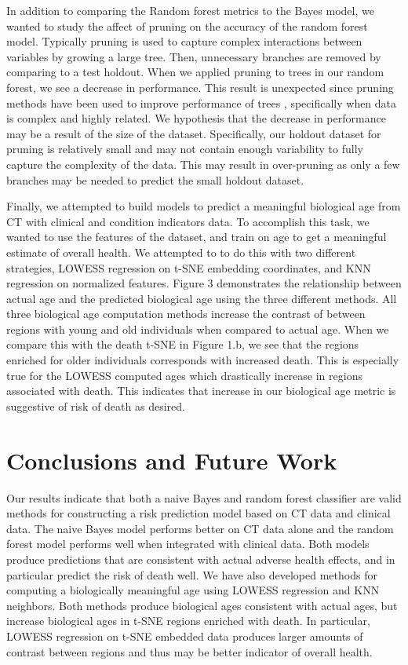 \documentclass{article}
\begin{document}
In addition to comparing the Random forest metrics to the Bayes model, we wanted to study the affect of pruning on the accuracy of the random forest model. Typically pruning is used to capture complex interactions between variables by growing a large tree. Then, unnecessary branches are removed by comparing to a test holdout. When we applied pruning to trees in our random forest, we see a decrease in performance. This result is unexpected since pruning methods have been used to improve performance of trees \cite{nortonGeneratingBetterDecision1989}, specifically when data is complex and highly related. We hypothesis that the decrease in performance may be a result of the size of the dataset. Specifically, our holdout dataset for pruning is relatively small and may not contain enough variability to fully capture the complexity of the data. This may result in over-pruning as only a few branches may be needed to predict the small holdout dataset. 

Finally, we attempted to build models to predict a meaningful biological age from CT with clinical and condition indicators data. To accomplish this task, we wanted to use the features of the dataset, and train on age to get a meaningful estimate of overall health. We attempted to to do this with two different strategies, LOWESS regression on t-SNE embedding coordinates, and KNN regression on normalized features. Figure 3 demonstrates the relationship between actual age and the predicted biological age using the three different methods. All three biological age computation methods increase the contrast of between regions with young and old individuals when compared to actual age. When we compare this with the death t-SNE in Figure 1.b, we see that the regions enriched for older individuals corresponds with increased death. This is especially true for the LOWESS computed ages which drastically increase in regions associated with death. This indicates that increase in our biological age metric is suggestive of risk of death as desired. 


\section{Conclusions and Future Work}
Our results indicate that both a naive Bayes and random forest classifier are valid methods for constructing a risk prediction model based on CT data and clinical data. The naive Bayes model performs better on CT data alone and the random forest model performs well when integrated with clinical data. Both models produce predictions that are consistent with actual adverse health effects, and in particular predict the risk of death well. We have also developed methods for computing a biologically meaningful age using LOWESS regression and KNN neighbors. Both methods produce biological ages consistent with actual ages, but increase biological ages in t-SNE regions enriched with death. In particular, LOWESS regression on t-SNE embedded data produces larger amounts of contrast between regions and thus may be better indicator of overall health. 
\end{document}
